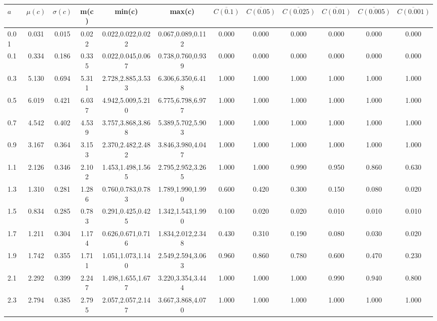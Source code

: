 \begin{table*}[h!]
\begin{center}
\begin{tabular}{| l | c | c | c | c | c | c | c | c | c | c | c |}\hline
$a$ & $\mu(c)$ & $\sigma(c)$ & m(c) & min(c) & max(c) & $\overline{C(0.1)}$ & $\overline{C(0.05)}$ & $\overline{C(0.025)}$ & $\overline{C(0.01)}$ & $\overline{C(0.005)}$ & $\overline{C(0.001)}$ \\\hline
0.01 & 0.031 & 0.015 & 0.022 & 0.022,0.022,0.022 & 0.067,0.089,0.112  & 0.000  & 0.000  & 0.000  & 0.000  & 0.000  & 0.000 \\\hline
0.1 & 0.334 & 0.186 & 0.335 & 0.022,0.045,0.067 & 0.738,0.760,0.939  & 0.000  & 0.000  & 0.000  & 0.000  & 0.000  & 0.000 \\\hline
0.3 & 5.130 & 0.694 & 5.311 & 2.728,2.885,3.533 & 6.306,6.350,6.418  & 1.000  & 1.000  & 1.000  & 1.000  & 1.000  & 1.000 \\\hline
0.5 & 6.019 & 0.421 & 6.037 & 4.942,5.009,5.210 & 6.775,6.798,6.977  & 1.000  & 1.000  & 1.000  & 1.000  & 1.000  & 1.000 \\\hline
0.7 & 4.542 & 0.402 & 4.539 & 3.757,3.868,3.868 & 5.389,5.702,5.903  & 1.000  & 1.000  & 1.000  & 1.000  & 1.000  & 1.000 \\\hline
0.9 & 3.167 & 0.364 & 3.153 & 2.370,2.482,2.482 & 3.846,3.980,4.047  & 1.000  & 1.000  & 1.000  & 1.000  & 1.000  & 1.000 \\\hline
1.1 & 2.126 & 0.346 & 2.102 & 1.453,1.498,1.565 & 2.795,2.952,3.265  & 1.000  & 1.000  & 0.990  & 0.950  & 0.860  & 0.630 \\\hline
1.3 & 1.310 & 0.281 & 1.286 & 0.760,0.783,0.783 & 1.789,1.990,1.990  & 0.600  & 0.420  & 0.300  & 0.150  & 0.080  & 0.020 \\\hline
1.5 & 0.834 & 0.285 & 0.783 & 0.291,0.425,0.425 & 1.342,1.543,1.990  & 0.100  & 0.020  & 0.020  & 0.010  & 0.010  & 0.010 \\\hline
1.7 & 1.211 & 0.304 & 1.174 & 0.626,0.671,0.716 & 1.834,2.012,2.348  & 0.430  & 0.310  & 0.190  & 0.080  & 0.030  & 0.020 \\\hline
1.9 & 1.742 & 0.355 & 1.711 & 1.051,1.073,1.140 & 2.549,2.594,3.063  & 0.960  & 0.860  & 0.780  & 0.600  & 0.470  & 0.230 \\\hline
2.1 & 2.292 & 0.399 & 2.247 & 1.498,1.655,1.677 & 3.220,3.354,3.444  & 1.000  & 1.000  & 1.000  & 0.990  & 0.940  & 0.800 \\\hline
2.3 & 2.794 & 0.385 & 2.795 & 2.057,2.057,2.147 & 3.667,3.868,4.070  & 1.000  & 1.000  & 1.000  & 1.000  & 1.000  & 1.000 \\\hline

\end{tabular}
\end{center}
\end{table*}
